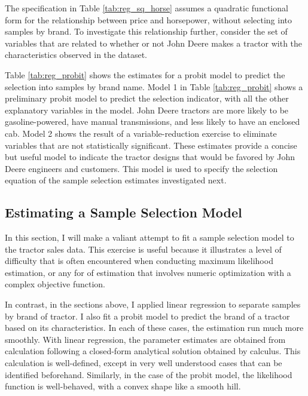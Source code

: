 The specification in 
Table \ref{tab:reg_sq_horse}
assumes a quadratic functional form for
the relationship between price and horsepower, 
without selecting into samples by brand.
% 
To investigate this relationship further, 
consider the set of variables that are related to
whether or not John Deere makes a tractor
with the characteristics observed in the dataset. 



Table \ref{tab:reg_probit} 
shows the estimates for a probit model to predict the selection
into samples by brand name.
% 
Model 1 in Table \ref{tab:reg_probit} 
shows a preliminary probit model to predict the selection indicator,
with all the other explanatory variables in the model.
John Deere tractors are more likely to be gasoline-powered,
have manual transmissions, and less likely to have an enclosed cab.
% 
Model 2 shows the result of a variable-reduction exercise
to eliminate variables that are not statistically significant.
These estimates provide a concise but useful model to
indicate the tractor designs that would be favored by John Deere
engineers and customers.
This model is used to specify the selection equation
of the sample selection estimates investigated next. 
 
\subsection{Estimating a Sample Selection Model}

In this section, I will make a valiant attempt to fit 
a sample selection model to the tractor sales data. 
This exercise is useful because it illustrates a level of difficulty
that is often encountered when conducting maximum likelihood estimation, 
or any for of estimation that involves numeric optimization
with a complex objective function. 
% 

In contrast, in the sections above, I applied linear regression
to separate samples by brand of tractor. 
I also fit a probit model to predict the brand of a tractor 
based on its characteristics. 
In each of these cases, the estimation run much more smoothly. 
With linear regression, the parameter estimates are obtained 
from calculation following a closed-form analytical solution obtained by calculus. 
This calculation is well-defined, except in very well understood cases
that can be identified beforehand. 
Similarly, in the case of the probit model, the likelihood function is well-behaved, with a convex shape like a smooth hill. 

